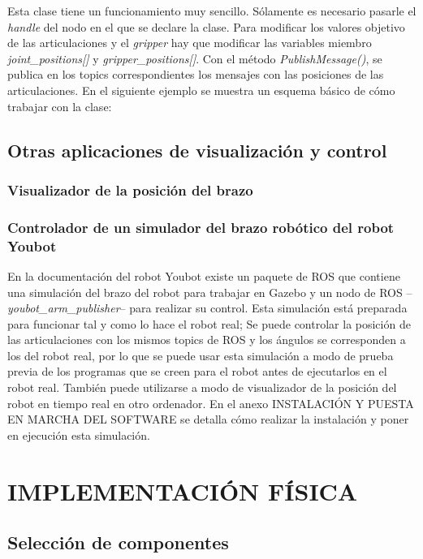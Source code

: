 \documentclass[12pt, a4paper]{report}
\begin{document}
Esta clase tiene un funcionamiento muy sencillo. Sólamente es necesario pasarle el \textit{handle} del nodo en el que se declare la clase. Para modificar los valores objetivo de las articulaciones y el \textit{gripper} hay que modificar las variables miembro \textit{joint\_positions[]} y \textit{gripper\_positions[]}. Con el método \textit{PublishMessage()}, se publica en los topics correspondientes los mensajes con las posiciones de las articulaciones. En el siguiente ejemplo se muestra un esquema básico de cómo trabajar con la clase:\\

\lstset{inputencoding=utf8/latin1}


\section{Otras aplicaciones de visualización y control}

\subsection{Visualizador de la posición del brazo}

\subsection{Controlador de un simulador del brazo robótico del robot Youbot}

En la documentación del robot Youbot existe un paquete de ROS que contiene una simulación del brazo del robot para trabajar en Gazebo y un nodo de ROS --\textit{youbot\_arm\_publisher}-- para realizar su control. Esta simulación está preparada para funcionar tal y como lo hace el robot real; Se puede controlar la posición de las articulaciones con los mismos topics de ROS y los ángulos se corresponden a los del robot real, por lo que se puede usar esta simulación a modo de prueba previa de los programas que se creen para el robot antes de ejecutarlos en el robot real. También puede utilizarse a modo de visualizador de la posición del robot en tiempo real en otro ordenador. En el anexo INSTALACIÓN Y PUESTA EN MARCHA DEL SOFTWARE se detalla cómo realizar la instalación y poner en ejecución esta simulación.

\chapter{IMPLEMENTACIÓN FÍSICA}
\section{Selección de componentes}
\end{document}
